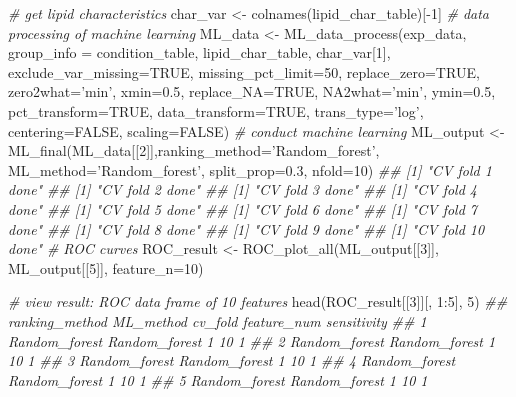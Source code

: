 \documentclass[]{article}
\newcommand{\hlnum}[1]{\textcolor[rgb]{0.816,0.125,0.439}{#1}}%
\newcommand{\hlstr}[1]{\textcolor[rgb]{0.251,0.627,0.251}{#1}}%
\newcommand{\hlcom}[1]{\textcolor[rgb]{0.502,0.502,0.502}{\textit{#1}}}%
\newcommand{\hlopt}[1]{\textcolor[rgb]{0,0,0}{#1}}%
\newcommand{\hlstd}[1]{\textcolor[rgb]{0.251,0.251,0.251}{#1}}%
\newcommand{\hlkwc}[1]{\textcolor[rgb]{0.251,0.251,0.251}{#1}}%
\newcommand{\hlkwd}[1]{\textcolor[rgb]{0.878,0.439,0.125}{#1}}%
\newenvironment{Shaded}{\begin{myshaded}}{\end{myshaded}}
\newcommand{\KeywordTok}[1]{\hlkwd{#1}}
\newcommand{\DataTypeTok}[1]{\hlkwc{#1}}
\newcommand{\DecValTok}[1]{\hlnum{#1}}
\newcommand{\FloatTok}[1]{\hlnum{#1}}
\newcommand{\StringTok}[1]{\hlstr{#1}}
\newcommand{\CommentTok}[1]{\hlcom{#1}}
\newcommand{\OtherTok}[1]{{#1}}
\newcommand{\OperatorTok}[1]{\hlopt{#1}}
\newcommand{\NormalTok}[1]{\hlstd{#1}}
\begin{document}
\begin{Shaded}
\begin{Highlighting}[]
\CommentTok{# get lipid characteristics}
\NormalTok{char_var <-}\StringTok{ }\KeywordTok{colnames}\NormalTok{(lipid_char_table)[}\OperatorTok{-}\DecValTok{1}\NormalTok{]}
\CommentTok{# data processing of machine learning}
\NormalTok{ML_data <-}\StringTok{ }\KeywordTok{ML_data_process}\NormalTok{(exp_data, }\DataTypeTok{group_info =}\NormalTok{ condition_table,}
\NormalTok{                           lipid_char_table, char_var[}\DecValTok{1}\NormalTok{],}
                           \DataTypeTok{exclude_var_missing=}\OtherTok{TRUE}\NormalTok{, }\DataTypeTok{missing_pct_limit=}\DecValTok{50}\NormalTok{,}
                           \DataTypeTok{replace_zero=}\OtherTok{TRUE}\NormalTok{, }\DataTypeTok{zero2what=}\StringTok{'min'}\NormalTok{, }\DataTypeTok{xmin=}\FloatTok{0.5}\NormalTok{,}
                           \DataTypeTok{replace_NA=}\OtherTok{TRUE}\NormalTok{, }\DataTypeTok{NA2what=}\StringTok{'min'}\NormalTok{, }\DataTypeTok{ymin=}\FloatTok{0.5}\NormalTok{,}
                           \DataTypeTok{pct_transform=}\OtherTok{TRUE}\NormalTok{, }\DataTypeTok{data_transform=}\OtherTok{TRUE}\NormalTok{,}
                           \DataTypeTok{trans_type=}\StringTok{'log'}\NormalTok{, }\DataTypeTok{centering=}\OtherTok{FALSE}\NormalTok{, }\DataTypeTok{scaling=}\OtherTok{FALSE}\NormalTok{)}
\CommentTok{# conduct machine learning}
\NormalTok{ML_output <-}\StringTok{ }\KeywordTok{ML_final}\NormalTok{(ML_data[[}\DecValTok{2}\NormalTok{]],}\DataTypeTok{ranking_method=}\StringTok{'Random_forest'}\NormalTok{,}
                      \DataTypeTok{ML_method=}\StringTok{'Random_forest'}\NormalTok{, }\DataTypeTok{split_prop=}\FloatTok{0.3}\NormalTok{, }\DataTypeTok{nfold=}\DecValTok{10}\NormalTok{)}
\CommentTok{## [1] "CV fold 1 done"}
\CommentTok{## [1] "CV fold 2 done"}
\CommentTok{## [1] "CV fold 3 done"}
\CommentTok{## [1] "CV fold 4 done"}
\CommentTok{## [1] "CV fold 5 done"}
\CommentTok{## [1] "CV fold 6 done"}
\CommentTok{## [1] "CV fold 7 done"}
\CommentTok{## [1] "CV fold 8 done"}
\CommentTok{## [1] "CV fold 9 done"}
\CommentTok{## [1] "CV fold 10 done"}
\CommentTok{# ROC curves}
\NormalTok{ROC_result <-}\StringTok{ }\KeywordTok{ROC_plot_all}\NormalTok{(ML_output[[}\DecValTok{3}\NormalTok{]], ML_output[[}\DecValTok{5}\NormalTok{]], }\DataTypeTok{feature_n=}\DecValTok{10}\NormalTok{)}

\CommentTok{# view result: ROC data frame of 10 features}
\KeywordTok{head}\NormalTok{(ROC_result[[}\DecValTok{3}\NormalTok{]][, }\DecValTok{1}\OperatorTok{:}\DecValTok{5}\NormalTok{], }\DecValTok{5}\NormalTok{)}
\CommentTok{##   ranking_method     ML_method cv_fold feature_num sensitivity}
\CommentTok{## 1  Random_forest Random_forest       1          10           1}
\CommentTok{## 2  Random_forest Random_forest       1          10           1}
\CommentTok{## 3  Random_forest Random_forest       1          10           1}
\CommentTok{## 4  Random_forest Random_forest       1          10           1}
\CommentTok{## 5  Random_forest Random_forest       1          10           1}


\end{Highlighting}
\end{Shaded}
\end{document}
